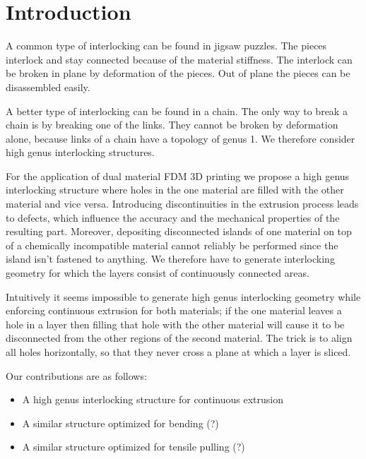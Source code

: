 \section{Introduction}


A common type of interlocking can be found in jigsaw puzzles.
The pieces interlock and stay connected because of the material stiffness.
The interlock can be broken in plane by deformation of the pieces.
Out of plane the pieces can be disassembled easily.

A better type of interlocking can be found in a chain.
The only way to break a chain is by breaking one of the links.
They cannot be broken by deformation alone, because links of a chain have a topology of genus 1.
We therefore consider high genus interlocking structures.

For the application of dual material FDM 3D printing we propose a high genus interlocking structure where holes in the one material are filled with the other material and vice versa.
Introducing discontinuities in the extrusion process leads to defects, which influence the accuracy and the mechanical properties of the resulting part.
Moreover, depositing disconnected islands of one material on top of a chemically incompatible material cannot reliably be performed since the island isn't fastened to anything.
We therefore have to generate interlocking geometry for which the layers consist of continuously connected areas.

Intuitively it seems impossible to generate high genus interlocking geometry while enforcing continuous extrusion for both materials;
if the one material leaves a hole in a layer then filling that hole with the other material will cause it to be disconnected from the other regions of the second material.
The trick is to align all holes horizontally, so that they never cross a plane at which a layer is sliced.



Our contributions are as follows:
\begin{itemize}
	\item A high genus interlocking structure for continuous extrusion
	\item A similar structure optimized for bending (?)
	\item A similar structure optimized for tensile pulling (?)
\end{itemize}
